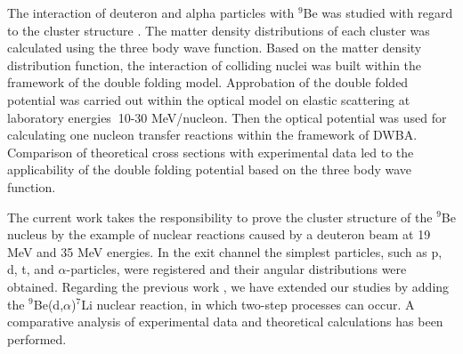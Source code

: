 \documentclass[10pt]{iopart}
\begin{document}
The interaction of deuteron and alpha particles with $^9$Be was studied with regard to the cluster structure \cite{urazbekov2016, urazbekov2017} . The matter density distributions of each cluster was calculated using the three body wave function.  Based on the matter density distribution function, the interaction of colliding nuclei was built within the framework of the double folding model. Approbation of  the double folded potential was carried out within the optical model on elastic scattering at laboratory energies $~$10-30 MeV/nucleon. Then the optical potential was used for calculating one nucleon transfer reactions within the framework of DWBA. Comparison of theoretical cross sections with experimental data  led to the applicability of the double folding potential based on the three body wave function.

The current work takes the responsibility to prove the cluster structure of the $^9$Be nucleus by the example of nuclear reactions caused by a deuteron beam at 19 MeV and 35 MeV energies. In the exit channel the simplest particles, such as p, d, t, and $\alpha$-particles, were registered and their angular distributions were obtained. Regarding  the previous work \cite{urazbekov2017}, we have extended our studies by adding the $^9$Be(d,$\alpha$)$^7$Li nuclear reaction, in which  two-step processes can  occur. A comparative analysis of experimental data and theoretical calculations has been performed.
	
\end{document}
